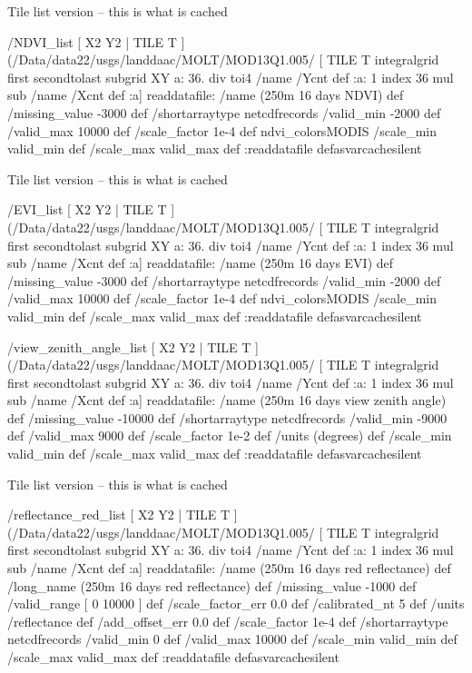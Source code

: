 Tile list version -- this is what is cached
\begin{ingrid}
/NDVI_list
{
[ X2 Y2 | TILE T ]
(/Data/data22/usgs/landdaac/MOLT/MOD13Q1.005/%
 [ TILE T integralgrid first secondtolast subgrid
XY
  a:
    36. div
    toi4
    /name /Ycnt def
    :a: 1 index
      36 mul
      sub
     /name /Xcnt def
     :a] 
readdatafile:
/name (250m 16 days NDVI) def
/missing_value -3000 def
/shortarraytype netcdfrecords
/valid_min -2000 def
/valid_max 10000 def
/scale_factor 1e-4 def
ndvi_colorsMODIS
/scale_min valid_min def
/scale_max valid_max def
:readdatafile
} defasvarcachesilent
\end{ingrid}
Tile list version -- this is what is cached
\begin{ingrid}
/EVI_list
{
[ X2 Y2 | TILE T ]
(/Data/data22/usgs/landdaac/MOLT/MOD13Q1.005/%
 [ TILE T integralgrid first secondtolast subgrid
XY
  a:
    36. div
    toi4
    /name /Ycnt def
    :a: 1 index
      36 mul
      sub
     /name /Xcnt def
     :a] 
readdatafile:
/name (250m 16 days EVI) def
/missing_value -3000 def
/shortarraytype netcdfrecords
/valid_min -2000 def
/valid_max 10000 def
/scale_factor 1e-4 def
ndvi_colorsMODIS
/scale_min valid_min def
/scale_max valid_max def
:readdatafile
} defasvarcachesilent
\end{ingrid}
\begin{ingrid}
/view_zenith_angle_list
{
[ X2 Y2 | TILE T ]
(/Data/data22/usgs/landdaac/MOLT/MOD13Q1.005/%
 [ TILE T integralgrid first secondtolast subgrid
XY
  a:
    36. div
    toi4
    /name /Ycnt def
    :a: 1 index
      36 mul
      sub
     /name /Xcnt def
     :a] 
readdatafile:
/name (250m 16 days view zenith angle) def
/missing_value -10000 def
/shortarraytype netcdfrecords
/valid_min -9000 def
/valid_max 9000 def
/scale_factor 1e-2 def
/units (degrees) def
/scale_min valid_min def
/scale_max valid_max def
:readdatafile
} defasvarcachesilent
\end{ingrid}
Tile list version -- this is what is cached
\begin{ingrid}
/reflectance_red_list
{
[ X2 Y2 | TILE T ]
(/Data/data22/usgs/landdaac/MOLT/MOD13Q1.005/%
 [ TILE T integralgrid first secondtolast subgrid
XY
  a:
    36. div
    toi4
    /name /Ycnt def
    :a: 1 index
      36 mul
      sub
     /name /Xcnt def
     :a] 
readdatafile:
/name (250m 16 days red reflectance) def
/long_name (250m 16 days red reflectance) def
 /missing_value -1000 def
 /valid_range [ 0 10000 ] def
 /scale_factor_err 0.0 def
  /calibrated_nt 5 def
 /units /reflectance def
 /add_offset_err 0.0 def
 /scale_factor 1e-4 def
/shortarraytype netcdfrecords
/valid_min 0 def
/valid_max 10000 def
/scale_min valid_min def
/scale_max valid_max def
:readdatafile
} defasvarcachesilent
\end{ingrid}
